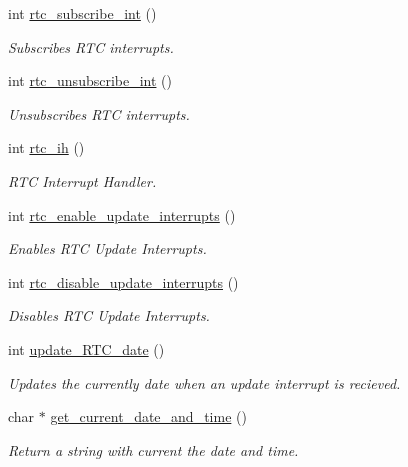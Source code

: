 \begin{DoxyCompactItemize}
\item 
int \mbox{\hyperlink{group__rtc_gabd8de825e876e8ef94c64ac616f68a11}{rtc\+\_\+subscribe\+\_\+int}} ()
\begin{DoxyCompactList}\small\item\em Subscribes R\+TC interrupts. \end{DoxyCompactList}\item 
int \mbox{\hyperlink{group__rtc_gab8f17bf5280c908c8b199a90fefcc758}{rtc\+\_\+unsubscribe\+\_\+int}} ()
\begin{DoxyCompactList}\small\item\em Unsubscribes R\+TC interrupts. \end{DoxyCompactList}\item 
int \mbox{\hyperlink{group__rtc_ga57f7116af216e3779ad9d6e98351d329}{rtc\+\_\+ih}} ()
\begin{DoxyCompactList}\small\item\em R\+TC Interrupt Handler. \end{DoxyCompactList}\item 
int \mbox{\hyperlink{group__rtc_ga1d3c9242fe8175549f6b898cf55582fd}{rtc\+\_\+enable\+\_\+update\+\_\+interrupts}} ()
\begin{DoxyCompactList}\small\item\em Enables R\+TC Update Interrupts. \end{DoxyCompactList}\item 
int \mbox{\hyperlink{group__rtc_ga71a212cd88a2e2b09096d345a86c1eb8}{rtc\+\_\+disable\+\_\+update\+\_\+interrupts}} ()
\begin{DoxyCompactList}\small\item\em Disables R\+TC Update Interrupts. \end{DoxyCompactList}\item 
int \mbox{\hyperlink{group__rtc_gac55b23b9b681e0bd120a88e35580825a}{update\+\_\+\+R\+T\+C\+\_\+date}} ()
\begin{DoxyCompactList}\small\item\em Updates the currently date when an update interrupt is recieved. \end{DoxyCompactList}\item 
char $\ast$ \mbox{\hyperlink{group__rtc_ga42d5a1a9ae07d38ec73c43499ec429ee}{get\+\_\+current\+\_\+date\+\_\+and\+\_\+time}} ()
\begin{DoxyCompactList}\small\item\em Return a string with current the date and time. \end{DoxyCompactList}\end{DoxyCompactItemize}


